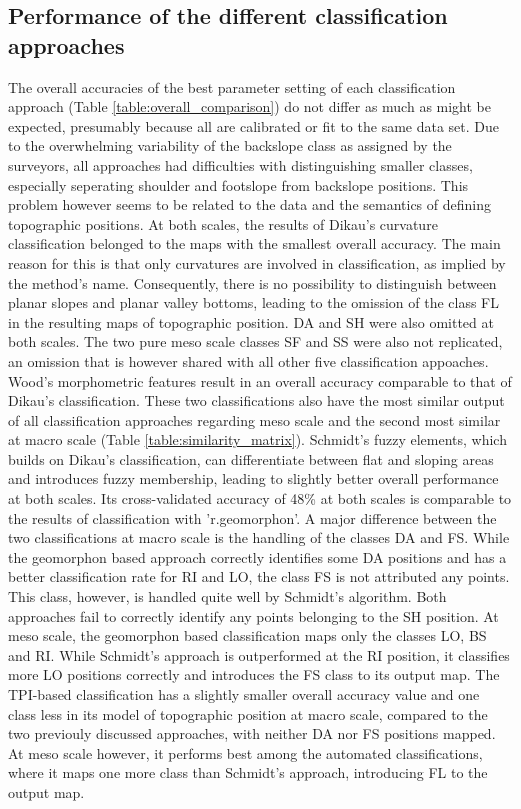 \documentclass[preprint,12pt,authoryear]{elsarticle}
\begin{document}
\subsection{Performance of the different classification approaches}  
The overall accuracies of the best parameter setting of each classification approach (Table \ref{table:overall_comparison}) do not differ as much as might be expected, presumably because all are calibrated or fit to the same data set. Due to the overwhelming variability of the backslope class as assigned by the surveyors, all approaches had difficulties with distinguishing smaller classes, especially seperating shoulder and footslope from backslope positions. This problem however seems to be related to the data and the semantics of defining topographic positions. 
At both scales, the results of Dikau's curvature classification belonged to the maps with the smallest overall accuracy. The main reason for this is that only curvatures are involved in classification, as implied by the method's name. Consequently, there is no possibility to distinguish between planar slopes and planar valley bottoms, leading to the omission of the class FL in the resulting maps of topographic position. DA and SH were also omitted at both scales. The two pure meso scale classes SF and SS were also not replicated, an omission that is however shared with all other five classification appoaches. Wood's morphometric features result in an overall accuracy comparable to that of Dikau's classification. These two classifications also have the most similar output of all classification approaches regarding meso scale and the second most similar at macro scale (Table \ref{table:similarity_matrix}). Schmidt's fuzzy elements, which builds on Dikau's classification, can differentiate between flat and sloping areas and introduces fuzzy membership, leading to slightly better overall performance at both scales. Its cross-validated accuracy of 48\% at both scales is comparable to the results of classification with 'r.geomorphon'.  A major difference between the two classifications at macro scale is the handling of the classes DA and FS. While the geomorphon based approach correctly identifies some DA positions and has a better classification rate for RI and LO, the class FS is not attributed any points. This class, however, is handled quite well by Schmidt's algorithm. Both approaches fail to correctly identify any points belonging to the SH position. At meso scale, the geomorphon based classification maps only the classes LO, BS and RI. While Schmidt's approach is outperformed at the RI position, it classifies more LO positions correctly and introduces the FS class to its output map. The TPI-based classification has a slightly smaller overall accuracy value and one class less in its model of topographic position at macro scale, compared to the two previouly discussed approaches, with neither DA nor FS positions mapped. At meso scale however, it performs best among the automated classifications, where it maps one more class than Schmidt's approach, introducing FL to the output map. 
\end{document}
